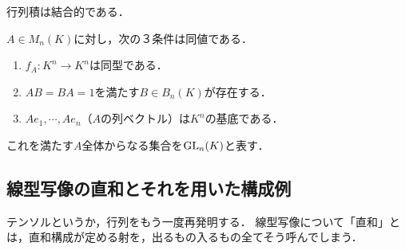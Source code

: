 \documentclass[uplatex, 12pt, dvipdfmx]{jsreport}
\begin{document}
\begin{corollary}
    行列積は結合的である．
\end{corollary}

\begin{proposition}[可逆行列]
    $A\in M_n(K)$に対し，次の３条件は同値である．
    \begin{enumerate}
        \item $f_A:K^n\to K^n$は同型である．
        \item $AB=BA=1$を満たす$B\in B_n(K)$が存在する．
        \item $Ae_1,\cdots,Ae_n$（$A$の列ベクトル）は$K^n$の基底である．
    \end{enumerate}
    これを満たす$A$全体からなる集合を$\mathrm{GL}_n(K)$と表す．
\end{proposition}

\subsection{線型写像の直和とそれを用いた構成例}

テンソルというか，行列をもう一度再発明する．
線型写像について「直和」とは，直和構成が定める射を，出るもの入るもの全てそう呼んでしまう．
\end{document}
